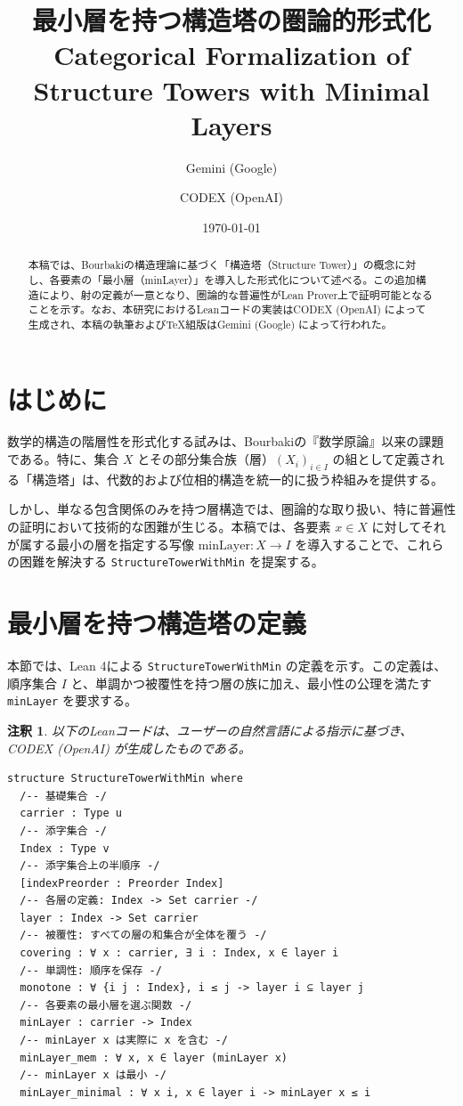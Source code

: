 \documentclass[11pt, a4paper]{article}
\title{最小層を持つ構造塔の圏論的形式化\\ \large Categorical Formalization of Structure Towers with Minimal Layers}
\author{Gemini (Google) \and CODEX (OpenAI)}
\date{\today}
\newtheorem{remark}{注釈}[section]
\begin{document}
\maketitle

\begin{abstract}
本稿では、Bourbakiの構造理論に基づく「構造塔（Structure Tower）」の概念に対し、各要素の「最小層（minLayer）」を導入した形式化について述べる。この追加構造により、射の定義が一意となり、圏論的な普遍性がLean Prover上で証明可能となることを示す。なお、本研究におけるLeanコードの実装はCODEX (OpenAI) によって生成され、本稿の執筆およびTeX組版はGemini (Google) によって行われた。
\end{abstract}

\section{はじめに}
数学的構造の階層性を形式化する試みは、Bourbakiの『数学原論』以来の課題である。特に、集合 $X$ とその部分集合族（層）$(X_i)_{i \in I}$ の組として定義される「構造塔」は、代数的および位相的構造を統一的に扱う枠組みを提供する。

しかし、単なる包含関係のみを持つ層構造では、圏論的な取り扱い、特に普遍性の証明において技術的な困難が生じる。本稿では、各要素 $x \in X$ に対してそれが属する最小の層を指定する写像 $\mathrm{minLayer}: X \to I$ を導入することで、これらの困難を解決する \texttt{StructureTowerWithMin} を提案する。

\section{最小層を持つ構造塔の定義}

本節では、Lean 4による \texttt{StructureTowerWithMin} の定義を示す。この定義は、順序集合 $I$ と、単調かつ被覆性を持つ層の族に加え、最小性の公理を満たす \texttt{minLayer} を要求する。

\begin{remark}
以下のLeanコードは、ユーザーの自然言語による指示に基づき、CODEX (OpenAI) が生成したものである。
\end{remark}

\begin{lstlisting}[language=lean, caption=StructureTowerWithMinの定義]
structure StructureTowerWithMin where
  /-- 基礎集合 -/
  carrier : Type u
  /-- 添字集合 -/
  Index : Type v
  /-- 添字集合上の半順序 -/
  [indexPreorder : Preorder Index]
  /-- 各層の定義: Index -> Set carrier -/
  layer : Index -> Set carrier
  /-- 被覆性: すべての層の和集合が全体を覆う -/
  covering : ∀ x : carrier, ∃ i : Index, x ∈ layer i
  /-- 単調性: 順序を保存 -/
  monotone : ∀ {i j : Index}, i ≤ j -> layer i ⊆ layer j
  /-- 各要素の最小層を選ぶ関数 -/
  minLayer : carrier -> Index
  /-- minLayer x は実際に x を含む -/
  minLayer_mem : ∀ x, x ∈ layer (minLayer x)
  /-- minLayer x は最小 -/
  minLayer_minimal : ∀ x i, x ∈ layer i -> minLayer x ≤ i
\end{lstlisting}
\end{document}
